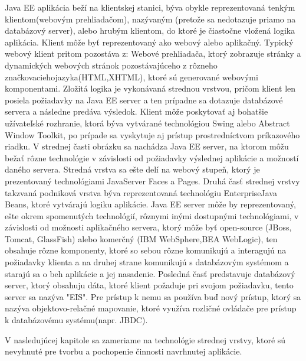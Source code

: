 Java EE aplikácia beží na klientskej stanici, býva obykle reprezentovaná tenkým klientom(webovým prehliadačom), nazývaným (pretože sa nedotazuje priamo na databázový server), alebo hrubým klientom, do ktoré je čiastočne vložená logika aplikácia. Klient môže byť reprezentovaný ako webový alebo aplikačný. Typický webový klient pritom pozostáva z:  Webové prehliadača, ktorý zobrazuje stránky a dynamických webových stránok pozostávajúceho  z rôzneho značkovaciehojazyka(HTML,XHTML), ktoré sú generované webovými komponentami. Zložitá logika je vykonávaná strednou vrstvou, pričom klient len posiela požiadavky na Java EE server a ten prípadne sa dotazuje databázové servera a následne predáva výsledok. Klient môže poskytovať aj bohatšie užívateľské rozhranie, ktorá býva vytvárané technológiou Swing alebo Abstract Window Toolkit\cite{guibook}, po prípade sa vyskytuje aj prístup prostredníctvom príkazového riadku. V strednej časti obrázku sa nachádza Java EE server, na ktorom môžu bežať rôzne technológie v závislosti od požiadavky výslednej aplikácie a možností daného servera.  Stredná vrstva sa ešte delí na webový stupeň, ktorý je prezentovaný technológiami JavaServer Faces a Pages. Druhá časť strednej vrstvy takzvaná podniková vrstva býva reprezentovaná technológiu EnterpriseJava Beans, ktoré vytvárajú logiku aplikácie. Java EE server môže by reprezentovaný, ešte okrem spomenutých technológií, rôznymi inými dostupnými technológiami, v závislosti od možnosti aplikačného servera, ktorý môže byť open-source (JBoss, Tomcat, GlassFish) alebo komerčný (IBM WebSphere,BEA WebLogic), ten obsahuje rôzne komponenty, ktoré so sebou rôzne komunikujú a interagujú na požiadavky klienta a na druhej strane komunikujú s databázovým systémom a starajú sa o beh aplikácie a jej nasadenie. Posledná časť predstavuje databázový server, ktorý obsahuju dáta, ktoré klient požaduje pri svojom požiadavku, tento server sa nazýva "EIS". Pre prístup k nemu sa používa buď nový prístup, ktorý sa nazýva objektovo-relačné mapovanie, ktoré využíva rozličné ovládače pre prístup k databázovému systému(napr. JBDC).

V nasledujúcej kapitole sa zameriame na technológie strednej vrstvy, ktoré sú nevyhnuté pre tvorbu a pochopenie činnosti navrhnutej aplikácie.


